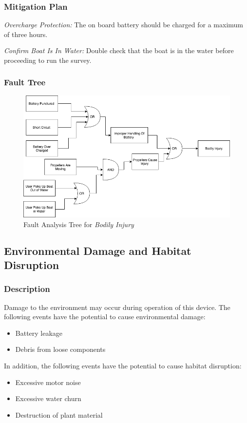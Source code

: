 \documentclass[11pt]{article}
\begin{document}
\subsubsection*{Mitigation Plan}
\textit{Overcharge Protection:} The on board battery should be charged for a maximum of three hours.

\textit{Confirm Boat Is In Water:} Double check that the boat is in the water before proceeding to run the survey. 

\subsubsection*{Fault Tree}
\begin{figure}[H]
   \centering
   \includegraphics[width=1\textwidth]{Diagrams/FTA-injury.png} %
   \caption{Fault Analysis Tree for \textit{Bodily Injury}}
   \label{fig:ft-Air}
\end{figure}

\subsection{Environmental Damage and Habitat Disruption}
\subsubsection*{Description}
Damage to the environment may occur during operation of this device. The following events have the potential to cause environmental damage:
\begin{itemize}
\item Battery leakage
\item Debris from loose components
\end{itemize}
In addition, the following events have the potential to cause habitat disruption:
\begin{itemize}
\item Excessive motor noise
\item Excessive water churn
\item Destruction of plant material
\end{itemize}
\end{document}
